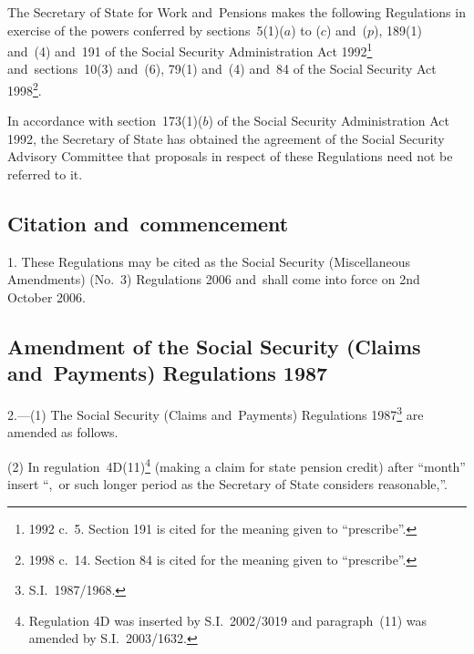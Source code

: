\documentclass[12pt,a4paper]{article}
\title{\regstitle}
\author{S.I.\ 2006 No.\ 2377}
\date{Made
4th September 2006\\
Laid before Parliament
8th September 2006\\
Coming into~force
2nd October 2006
}
\begin{document}
\maketitle

\enlargethispage{1.65405pt}

\noindent
The Secretary of State for Work and~Pensions makes the following Regulations in exercise of the powers conferred by sections~5(1)($a$)  to ($c$)  and~($p$), 189(1) and~(4) and~191 of the Social Security Administration Act 1992\footnote{1992 c.~5. Section 191 is cited for the meaning given to “prescribe”.} and~sections~10(3) and~(6), 79(1) and~(4) and~84 of the Social Security Act 1998\footnote{1998 c.~14. Section 84 is cited for the meaning given to “prescribe”.}.

In accordance with section~173(1)($b$)  of the Social Security Administration Act 1992, the Secretary of State has obtained the agreement of the Social Security Advisory Committee that proposals in respect of these Regulations need not be referred to it. 

{\sloppy

\tableofcontents

}

\bigskip

\setcounter{secnumdepth}{-2}

\subsection[1. Citation and~commencement]{Citation and~commencement}

1.  These Regulations may be cited as the Social Security (Miscellaneous Amendments) (No.~3) Regulations 2006 and~shall come into force on 2nd October 2006.

\subsection[2. Amendment of the Social Security (Claims and~Payments) Regulations 1987]{Amendment of the Social Security (Claims and~Payments) Regulations 1987}

2.---(1)  The Social Security (Claims and~Payments) Regulations 1987\footnote{S.I.~1987/1968.} are amended as follows.

(2) In regulation~4D(11)\footnote{Regulation 4D was inserted by S.I.~2002/3019 and paragraph~(11) was amended by S.I.~2003/1632.} (making a claim for state pension credit) after “month” insert “,~or such longer period as the Secretary of State considers reasonable,”.
\end{document}
